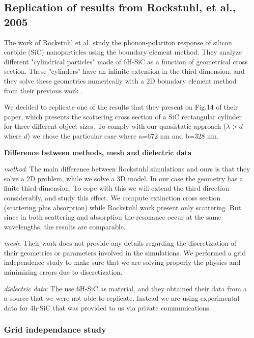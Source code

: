 
\subsection{Replication of results from Rockstuhl, et al., 2005}

The work of Rockstuhl et al.\cite{rockstuhl2005} study the phonon-polariton response of silicon carbide (SiC)
nanoparticles using the boundary element method. They analyze different "cylindrical particles"
made of 6H-SiC as a function of geometrical cross section. These "cylinders" have an infinite
extension in the third dimension, and they solve these geometries numerically with a 2D 
boundary element method from their previous work \cite{rockstuhl2003}. 

We decided to replicate one of the results that they present on Fig.14 of their paper, which 
presents the scattering cross section of a SiC rectangular cylinder for three different object 
sizes. To comply with our quasistatic approach ($\lambda > d$ where $d$) we chose the particular 
case where a=672 nm and b=328 nm.

\textbf{Difference between methods, mesh and dielectric data}

\textit{method}: The main difference between Rockstuhl simulations and ours is that they solve a 2D problem, 
while we solve a 3D model. In our case the geometry has a finite third dimension. To cope with this
we will extend the third direction considerably, and study this effect.
We compute extinction cross section (scattering plus absorption) while Rockstuhl work present only scattering. 
But since in both scattering and absorption the resonance occur at the same wavelengths, the results are 
comparable.

\textit{mesh}: Their work does not provide any details regarding the discretization of their geometries or 
parameters involved in the simulations. We performed a grid independence study to make sure that we are
solving properly the physics and minimizing errors due to discretization. 

\textit{dielectric data}: The use 6H-SiC as material, and they obtained their data from a a source that we
were not able to replicate. Instead we are using experimental data for 4h-SiC that was provided to us 
via private communications.  

\subsubsection{Grid independance study}

